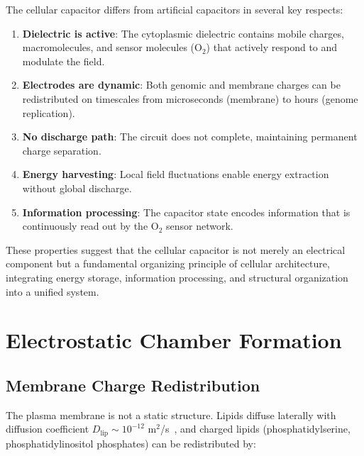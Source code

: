 \documentclass[twocolumn,10pt,aps,prd,superscriptaddress,floatfix,nofootinbib]{revtex4-2}
\theoremstyle{remark}
\begin{document}
The cellular capacitor differs from artificial capacitors in several key respects:

\begin{enumerate}
\item \textbf{Dielectric is active}: The cytoplasmic dielectric contains mobile charges, macromolecules, and sensor molecules (O$_2$) that actively respond to and modulate the field.

\item \textbf{Electrodes are dynamic}: Both genomic and membrane charges can be redistributed on timescales from microseconds (membrane) to hours (genome replication).

\item \textbf{No discharge path}: The circuit does not complete, maintaining permanent charge separation.

\item \textbf{Energy harvesting}: Local field fluctuations enable energy extraction without global discharge.

\item \textbf{Information processing}: The capacitor state encodes information that is continuously read out by the O$_2$ sensor network.
\end{enumerate}

These properties suggest that the cellular capacitor is not merely an electrical component but a fundamental organizing principle of cellular architecture, integrating energy storage, information processing, and structural organization into a unified system.

\section{Electrostatic Chamber Formation}
\label{sec:chambers}

\subsection{Membrane Charge Redistribution}

The plasma membrane is not a static structure. Lipids diffuse laterally with diffusion coefficient $D_{\mathrm{lip}} \sim 10^{-12}$ m$^2$/s~\cite{Saffman1975}, and charged lipids (phosphatidylserine, phosphatidylinositol phosphates) can be redistributed by:
\end{document}
